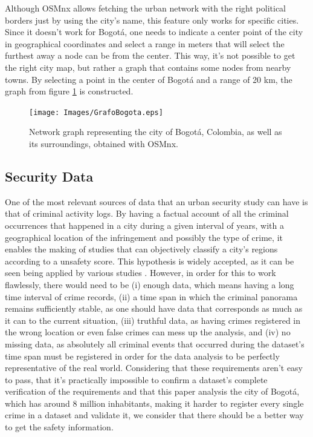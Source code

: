 \documentclass[runningheads]{llncs}
\begin{document}
Although OSMnx \cite{geoff_osmnx:_2017} allows fetching the urban network with the right political borders just by using the city's name, this feature only works for specific cities. Since it doesn't work for Bogotá, one needs to indicate a center point of the city in geographical coordinates and select a range in meters that will select the furthest away a node can be from the center. This way, it's not possible to get the right city map, but rather a graph that contains some nodes from nearby towns. By selecting a point in the center of Bogotá and a range of 20 km, the graph from figure \ref{fig:FirstBogGraph} is constructed.

\begin{figure}[!h]
  \centering
  \texttt{[image: Images/GrafoBogota.eps]}
  \caption{Network graph representing the city of Bogotá, Colombia, as well as its surroundings, obtained with OSMnx.}
  \label{fig:FirstBogGraph}
\end{figure}


\newpage
\subsection{Security Data}

One of the most relevant sources of data that an urban security study can have is that of criminal activity logs. By having a factual account of all the criminal occurrences that happened in a city during a given interval of years, with a geographical location of the infringement and possibly the type of crime, it enables the making of studies that can objectively classify a city's regions according to a unsafety score. This hypothesis is widely accepted, as it can be seen being applied by various studies \cite{ceccato_space-time_2012} \cite{spadon_complex_2016}. However, in order for this to work flawlessly, there would need to be (i) enough data, which means having a long time interval of crime records, (ii) a time span in which the criminal panorama remains sufficiently stable, as one should have data that corresponds as much as it can to the current situation, (iii) truthful data, as having crimes registered in the wrong location or even false crimes can mess up the analysis, and (iv) no missing data, as absolutely all criminal events that occurred during the dataset's time span must be registered in order for the data analysis to be perfectly representative of the real world. Considering that these requirements aren't easy to pass, that it's practically impossible to confirm a dataset's complete verification of the requirements and that this paper analysis the city of Bogotá, which has around 8 million inhabitants, making it harder to register every single crime in a dataset and validate it, we consider that there should be a better way to get the safety information.
\end{document}
